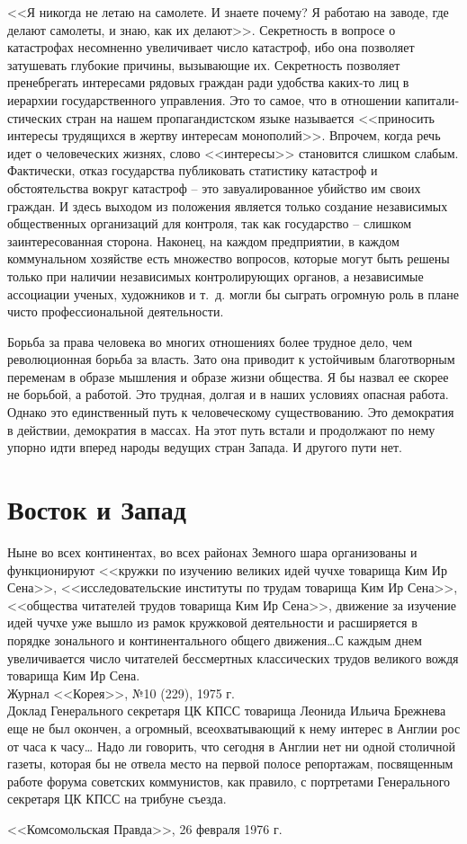 \documentclass{book}
\begin{document}
<<Я никогда не летаю на самолете. И знаете почему? Я работаю на заводе, где делают самолеты, и знаю, как их делают>>. Секрет­ность в вопросе о катастрофах несомненно увеличивает число ка­тастроф, ибо она позволяет затушевать глубокие причины, вызы­вающие их. Секретность позволяет пренебрегать интересами ря­довых граждан ради удобства каких-то лиц в иерархии государ­ственного управления. Это то самое, что в отношении капитали­стических стран на нашем пропагандистском языке называется <<приносить интересы трудящихся в жертву интересам монопо­лий>>. Впрочем, когда речь идет о человеческих жизнях, слово <<интересы>> становится слишком слабым. Фактически, отказ го­сударства публиковать статистику катастроф и обстоятельства вокруг катастроф -- это завуалированное убийство им своих граждан. И здесь выходом из положения является только созда­ние независимых общественных организаций для контроля, так как государство -- слишком заинтересованная сторона. Наконец, на каждом предприятии, в каждом коммунальном хозяйстве есть множество вопросов, которые могут быть решены только при наличии независимых контролирующих органов, а независи­мые ассоциации ученых, художников и т.~д. могли бы сыграть огромную роль в плане чисто профессиональной деятельности.

Борьба за права человека во многих отношениях более труд­ное дело, чем революционная борьба за власть. Зато она приво­дит к устойчивым благотворным переменам в образе мышления и образе жизни общества. Я бы назвал ее скорее не борьбой, а ра­ботой. Это трудная, долгая и в наших условиях опасная работа. Однако это единственный путь к человеческому существованию. Это демократия в действии, демократия в массах. На этот путь встали и продолжают по нему упорно идти вперед народы веду­щих стран Запада. И другого пути нет.

\section{Восток и Запад}
\epigraph{Ныне во всех континентах, во всех районах Земного шара организованы и функционируют <<кружки по изучению великих идей чучхе товарища Ким Ир Сена>>, <<исследовательские институты по трудам товарища Ким Ир Сена>>, <<общества читателей трудов товарища Ким Ир Сена>>, движение за изучение идей чучхе уже вышло из рамок кружковой деятельности и расширяется в порядке зонального и континентального общего движения\ldots С каждым днем увеличивается число читателей бессмертных классических трудов великого вождя товарища Ким Ир Сена.\\
Журнал <<Корея>>, №10 (229), 1975 г.\\
Доклад Генерального секретаря ЦК КПСС товарища Леонида Ильича Брежнева еще не был окончен, а огромный, всеохватывающий к нему интерес в Англии рос от часа к часу\ldots 
Надо ли говорить, что сегодня в Англии нет ни одной столичной газеты, которая бы не отвела место на первой полосе репортажам, посвященным работе форума советских коммунистов, как правило, с портретами Генерального секретаря ЦК КПСС на трибуне съезда.}{<<Комсомольская Правда>>, 26 февраля 1976 г.}
\end{document}
